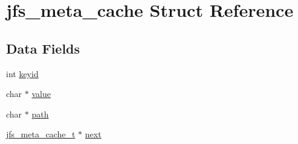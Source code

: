 \hypertarget{structjfs__meta__cache}{
\section{jfs\_\-meta\_\-cache Struct Reference}
\label{structjfs__meta__cache}
}
\subsection*{Data Fields}
\begin{DoxyCompactItemize}
\item 
int \hyperlink{structjfs__meta__cache_a0005293570ac16fd711fc871f3b1862c}{keyid}
\item 
char $\ast$ \hyperlink{structjfs__meta__cache_a79baf964da5fc55ed18c7f925c47fab6}{value}
\item 
char $\ast$ \hyperlink{structjfs__meta__cache_a2f1b7ec8936cfaa489936ecc024a586b}{path}
\item 
\hyperlink{structjfs__meta__cache}{jfs\_\-meta\_\-cache\_\-t} $\ast$ \hyperlink{structjfs__meta__cache_ae64f1523b58a1a2a72c895a9edcf6491}{next}
\end{DoxyCompactItemize}


